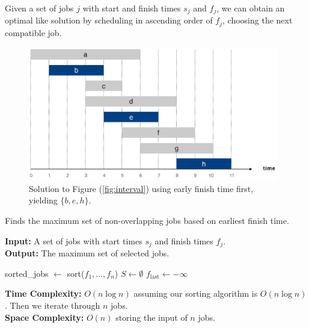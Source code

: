 \noindent
\begin{theo}
    
    \label{thm:eft}
    Given a set of jobs $j$ with start and finish times $s_j$ and $f_j$, we can obtain an optimal like solution by scheduling in ascending order of $f_j$,
    choosing the next compatible job.
\end{theo}
\begin{figure}[h]
    \begin{center}
      \includegraphics[height=2.3in]{./Sections/sched/interval/interval_sol.png}
    \end{center}
     \caption{Solution to Figure (\ref{fig:interval}) using early finish time first, yielding $\{b,e,h\}$.}\label{fig:interval_sol}
\end{figure}

\begin{Func}
    Finds the maximum set of non-overlapping jobs based on earliest finish time.

    \vspace{.5em}
    \noindent
    \textbf{Input:} A set of jobs with start times $s_j$ and finish times $f_j$.\\
    \textbf{Output:} The maximum set of selected jobs.\\
    \begin{algorithm}[H]
        \SetAlgoLined
        sorted\_jobs $\gets$ sort($f_1, \dots, f_n$) 
        $S \gets \emptyset$ 
        $f_{\text{last}} \gets -\infty$\;

    \end{algorithm}

    \noindent
    \textbf{Time Complexity:} $O(n\log n)$ assuming our sorting algorithm is $O(n\log n)$. Then we iterate through $n$ jobs.\\
    \textbf{Space Complexity:} $O(n)$ storing the input of $n$ jobs.
\end{Func}

